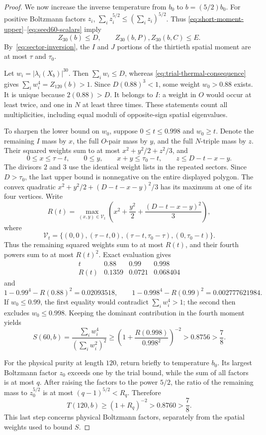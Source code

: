\begin{proof}
We now increase the inverse temperature from $b_0$ to
$b=(5/2)b_0$.  For positive Boltzmann factors $z_i$,
$\sum_i z_i^{5/2}\le(\sum_i z_i)^{5/2}$.  Thus
\eqref{eq:short-moment-upper}--\eqref{eq:seed60-scalars} imply
\[
 Z_{30}(b)\le D,\qquad Z_{30}(b,P),Z_{30}(b,C)\le E.
\]
By~\eqref{eq:sector-inversion}, the $I$ and $J$ portions of the thirtieth
spatial moment are at most $\tau$ and $\tau_0$.

Let $w_i=|\lambda_i(X_b)|^{30}$.  Then $\sum_iw_i\le D$, whereas
\eqref{eq:trial-thermal-consequence} gives $\sum_iw_i^4=Z_{120}(b)>1$.
Since $D(0.88)^3<1$, some weight $w_0>0.88$ exists.  It is unique because
$2(0.88)>D$.  It belongs to $I$: a weight in $O$ would occur at least twice,
and one in $N$ at least three times.  These statements count all
multiplicities, including equal moduli of opposite-sign spatial eigenvalues.

To sharpen the lower bound on $w_0$, suppose $0\le t\le0.998$ and $w_0\ge t$.
Denote the remaining
$I$ mass by $x$, the full $O$-pair mass by $y$, and the full $N$-triple mass
by $z$.  Their squared weights sum to at most $x^2+y^2/2+z^2/3$, and
\[
 0\le x\le\tau-t,\qquad 0\le y,\qquad
 x+y\le\tau_0-t,\qquad z\le D-t-x-y.
\]
The divisors $2$ and $3$ use the identical weight lists in the repeated
sectors.  Since $D>\tau_0$, the last upper bound is nonnegative on the entire
displayed polygon.  The convex quadratic
$x^2+y^2/2+(D-t-x-y)^2/3$ has its maximum at one of its four vertices.  Write
\begin{equation}\label{eq:residual-R}
 R(t)=\max_{(x,y)\in\mathcal V_t}
 \left(x^2+\frac{y^2}{2}+\frac{(D-t-x-y)^2}{3}\right),
\end{equation}
where
\[
 \mathcal V_t=\{(0,0),(\tau-t,0),
 (\tau-t,\tau_0-\tau),(0,\tau_0-t)\}.
\]
Thus the remaining squared weights sum to at most $R(t)$, and their fourth
powers sum to at most $R(t)^2$.  Exact evaluation gives
\[
\begin{array}{c|ccc}
 t&0.88&0.99&0.998\\ \hline
 R(t)&0.1359&0.0721&0.068404
\end{array}
\]
and
\[
 1-0.99^4-R(0.88)^2=0.02093518,\qquad
 1-0.998^4-R(0.99)^2=0.002777621984.
\]
If $w_0\le0.99$, the first equality would contradict
$\sum_iw_i^4>1$; the second then excludes $w_0\le0.998$.
Keeping the dominant contribution in the fourth moment yields
\[
 S(60,b)=\frac{\sum_iw_i^4}{(\sum_iw_i^2)^2}
 \ge\left(1+\frac{R(0.998)}{0.998^2}\right)^{-2}
 >0.8756>\frac78.
\]

For the physical purity at length $120$, return briefly to temperature $b_0$.
Its largest Boltzmann factor $z_0$ exceeds one by the trial bound, while the
sum of all factors is at most $q$.  After raising the factors to the power
$5/2$, the ratio of the remaining mass to $z_0^{5/2}$ is at most
$(q-1)^{5/2}<R_q$.  Therefore
\[
 T(120,b)\ge(1+R_q)^{-2}>0.8760>\frac78.
\]
This last step concerns physical Boltzmann factors, separately from the
spatial weights used to bound $S$.
\end{proof}

